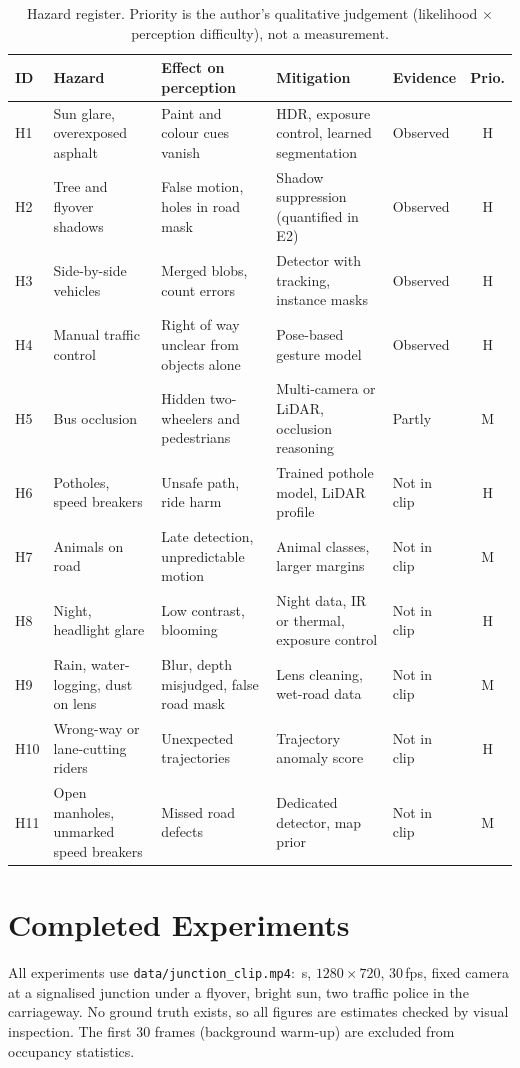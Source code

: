 \documentclass[11pt,a4paper]{article}
\begin{document}
\begin{table}[H]
\centering
\caption{Hazard register. Priority is the author's qualitative judgement (likelihood $\times$ perception difficulty), not a measurement.}
\small
\begin{tabular}{@{}l p{3.2cm} p{3.9cm} p{3.4cm} p{1.5cm} c@{}}
\toprule
ID & Hazard & Effect on perception & Mitigation & Evidence & Prio. \\
\midrule
H1 & Sun glare, overexposed asphalt & Paint and colour cues vanish & HDR, exposure control, learned segmentation & Observed & H \\
H2 & Tree and flyover shadows & False motion, holes in road mask & Shadow suppression (quantified in E2) & Observed & H \\
H3 & Side-by-side vehicles & Merged blobs, count errors & Detector with tracking, instance masks & Observed & H \\
H4 & Manual traffic control & Right of way unclear from objects alone & Pose-based gesture model & Observed & H \\
H5 & Bus occlusion & Hidden two-wheelers and pedestrians & Multi-camera or LiDAR, occlusion reasoning & Partly & M \\
H6 & Potholes, speed breakers & Unsafe path, ride harm & Trained pothole model, LiDAR profile & Not in clip & H \\
H7 & Animals on road & Late detection, unpredictable motion & Animal classes, larger margins & Not in clip & M \\
H8 & Night, headlight glare & Low contrast, blooming & Night data, IR or thermal, exposure control & Not in clip & H \\
H9 & Rain, water-logging, dust on lens & Blur, depth misjudged, false road mask & Lens cleaning, wet-road data & Not in clip & M \\
H10 & Wrong-way or lane-cutting riders & Unexpected trajectories & Trajectory anomaly score & Not in clip & H \\
H11 & Open manholes, unmarked speed breakers & Missed road defects & Dedicated detector, map prior & Not in clip & M \\
\bottomrule
\end{tabular}
\end{table}

\section{Completed Experiments}\label{sec:completed}
All experiments use \texttt{data/junction\_clip.mp4}: \mDuration\,s, $1280\times720$, 30\,fps, fixed camera at a signalised junction under a flyover,
bright sun, two traffic police in the carriageway. No ground truth exists, so all figures are estimates checked by visual inspection.
The first 30 frames (background warm-up) are excluded from occupancy statistics.
\end{document}
